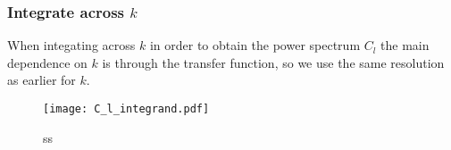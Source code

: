     \subsubsection{Integrate across $k$}
        When integating across $k$ in order to obtain the power spectrum $C_l$ the main dependence on $k$ is through the transfer function, so we use the same resolution as earlier for $k$. 
        \begin{figure}
            \texttt{[image: C\_l\_integrand.pdf]}
            \caption{ss}
            \label{fig:m3:some}
        \end{figure}

